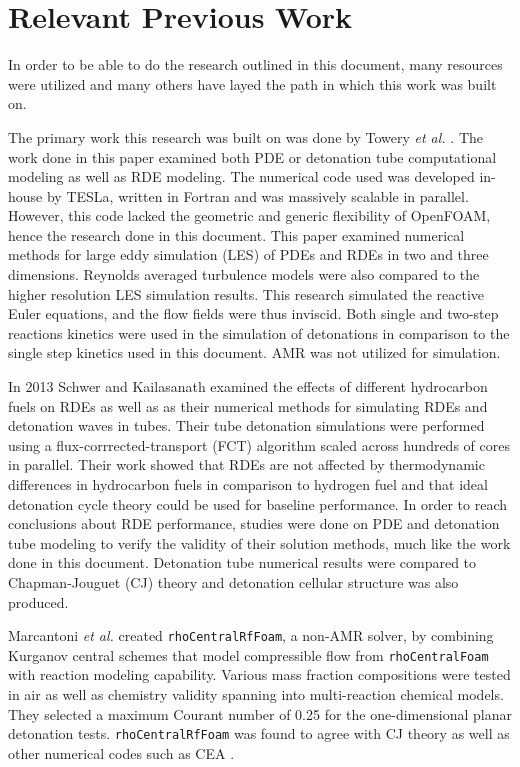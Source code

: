 \section{Relevant Previous Work}
In order to be able to do the research outlined in this document, many resources were utilized and many others have layed the path in which this work was built on. 

The primary work this research was built on was done by Towery \textit{et al.} \cite{towery1}. The work done in this paper examined both PDE or detonation tube computational modeling as well as RDE modeling. The numerical code used was developed in-house by TESLa, written in Fortran and was massively scalable in parallel. However, this code lacked the geometric and generic flexibility of OpenFOAM, hence the research done in this document. This paper examined numerical methods for large eddy simulation (LES) of PDEs and RDEs in two and three dimensions. Reynolds averaged turbulence models were also compared to the higher resolution LES simulation results. This research simulated the reactive Euler equations, and the flow fields were thus inviscid. Both single and two-step reactions kinetics were used in the simulation of detonations in comparison to the single step kinetics used in this document. AMR was not utilized for simulation. 

In 2013 Schwer and Kailasanath \cite{schwer1} examined the effects of different hydrocarbon fuels on RDEs as well as as their numerical methods for simulating RDEs and detonation waves in tubes. Their tube detonation simulations were performed using a flux-corrrected-transport (FCT) algorithm scaled across hundreds of cores in parallel. Their work showed that RDEs are not affected by thermodynamic differences in hydrocarbon fuels in comparison to hydrogen fuel and that ideal detonation cycle theory could be used for baseline performance. In order to reach conclusions about RDE performance, studies were done on PDE and detonation tube modeling to verify the validity of their solution methods, much like the work done in this document. Detonation tube numerical results were compared to Chapman\cite{chapman}-Jouguet\cite{jouguet} (CJ) theory  and detonation cellular structure was also produced. 

Marcantoni \textit{et al.} \cite{marcantoni} created \verb|rhoCentralRfFoam|, a non-AMR solver, by combining Kurganov central schemes that model compressible flow from \verb|rhoCentralFoam| \cite{greenshields} with reaction modeling capability. Various mass fraction compositions were tested in air as well as chemistry validity spanning into multi-reaction chemical models. They selected a maximum Courant number of 0.25 for the one-dimensional planar detonation tests. \verb|rhoCentralRfFoam| was found to agree with CJ theory as well as other numerical codes such as CEA \cite{CEA}. 

